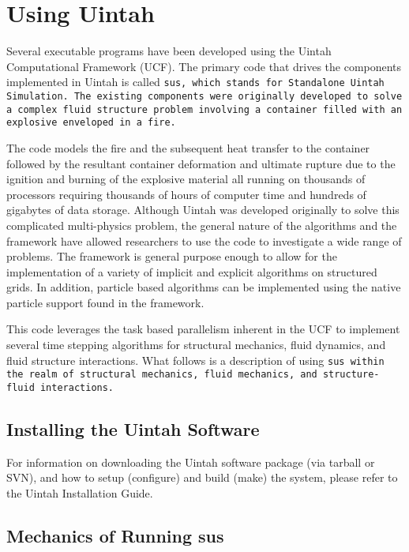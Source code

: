 \chapter{Using Uintah} \label{Chapter:UCF}

Several executable programs have been developed using the Uintah
Computational Framework (UCF).  The primary code that drives the
components implemented in Uintah is called \tt sus, \normalfont which
stands for Standalone Uintah Simulation.  The existing components were
originally developed to solve a complex fluid structure problem
involving a container filled with an explosive enveloped in a fire.

The code models the fire and the subsequent heat transfer to the
container followed by the resultant container deformation and ultimate
rupture due to the ignition and burning of the explosive material all
running on thousands of processors requiring thousands of hours of
computer time and hundreds of gigabytes of data storage.  Although
Uintah was developed originally to solve this complicated
multi-physics problem, the general nature of the algorithms and the
framework have allowed researchers to use the code to investigate a
wide range of problems.  The framework is general purpose enough to
allow for the implementation of a variety of implicit and explicit
algorithms on structured grids.  In addition, particle based
algorithms can be implemented using the native particle support found
in the framework.

This code leverages the task based parallelism inherent in the UCF to
implement several time stepping algorithms for structural mechanics,
fluid dynamics, and fluid structure interactions.  What follows is a
description of using \tt sus \normalfont within the realm of
structural mechanics, fluid mechanics, and structure-fluid
interactions.

\section{Installing the Uintah Software}

For information on downloading the Uintah software package (via
tarball or SVN), and how to setup (configure) and build (make) the
system, please refer to the Uintah Installation Guide.

\section{Mechanics of Running sus}

